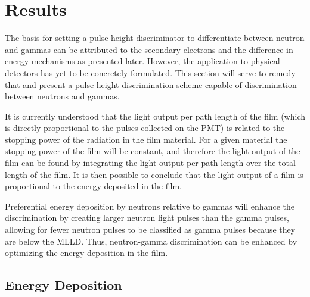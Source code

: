 \chapter{Results}
\label{chap:Results}

The basis for setting a pulse height discriminator to differentiate between neutron and gammas can be attributed to the secondary electrons and the difference in energy mechanisms as presented later.
However, the application to physical detectors has yet to be concretely formulated.
This section will serve to remedy that and present a pulse height discrimination scheme capable of discrimination between neutrons and gammas.

It is currently understood that the light output per path length of the film (which is directly proportional to the pulses collected on the PMT) is related to the stopping power of the radiation in the film material.
For a given material the stopping power of the film will be constant, and therefore the light output of the film can be found by integrating the light output per path length over the total length of the film.
It is then possible to conclude that the light output of a film is proportional to the energy deposited in the film.

Preferential energy deposition by neutrons relative to gammas will enhance the discrimination by creating larger neutron light pulses than the gamma pulses, allowing for fewer neutron pulses to be classified as gamma pulses because they are below the MLLD.
Thus, neutron-gamma discrimination can be enhanced by optimizing the energy deposition in the film. 

\section{Energy Deposition}
